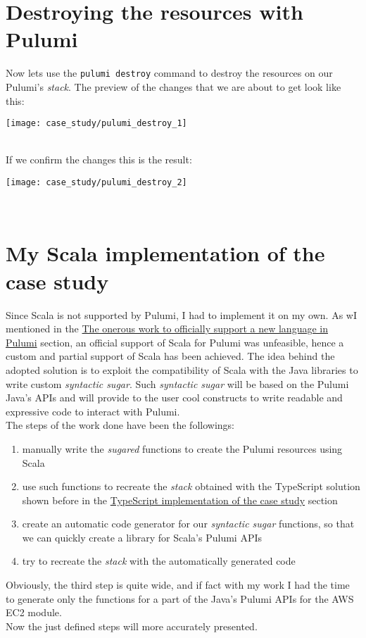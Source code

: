 \section{Destroying the resources with Pulumi}
Now lets use the \texttt{pulumi destroy} command to destroy the resources on our Pulumi's \textit{stack}.
The preview of the changes that we are about to get look like this:
\begin{center}
  \texttt{[image: case\_study/pulumi\_destroy\_1]} 
\end{center}\mbox{}\\

If we confirm the changes this is the result:
\begin{center}
  \texttt{[image: case\_study/pulumi\_destroy\_2]} 
\end{center}\mbox{}\\


\section{My Scala implementation of the case study}
Since Scala is not supported by Pulumi, I had to implement it on my own.
As wI mentioned in the \hyperref[sssec:off-support-pulumi]{The onerous work to officially support a new language in Pulumi} section, an official support of Scala for Pulumi was unfeasible, hence a custom and partial support of Scala has been achieved.
The idea behind the adopted solution is to exploit the compatibility of Scala with the Java libraries to write custom \textit{syntactic sugar}.
Such \textit{syntactic sugar} will be based on the Pulumi Java's APIs and will provide to the user cool constructs to write readable and expressive code to interact with Pulumi.\\
The steps of the work done have been the followings:
\begin{enumerate}
  \item manually write the \textit{sugared} functions to create the Pulumi resources using Scala
  \item use such functions to recreate the \textit{stack} obtained with the TypeScript solution shown before in the \hyperref[sec:typescript-impl]{TypeScript implementation of the case study} section
  \item create an automatic code generator for our \textit{syntactic sugar} functions, so that we can quickly create a library for Scala's Pulumi APIs
  \item try to recreate the \textit{stack} with the automatically generated code
\end{enumerate}
Obviously, the third step is quite wide, and if fact with my work I had the time to generate only the functions for a part of the Java's Pulumi APIs for the AWS EC2 module.\\
Now the just defined steps will more accurately presented.

